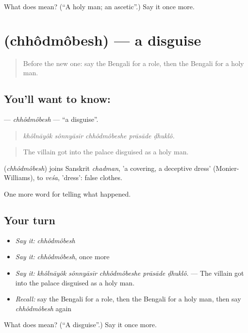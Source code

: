 \begin{tcolorbox}[breakable,colback=teal!4,colframe=teal!35!black,title={Before you move on}]
What does  mean? (\textquotedblleft{}A holy man; an ascetic\textquotedblright{}.) Say it once more.
\end{tcolorbox}
\section[\texorpdfstring{\bn{ছদ্মবেশ} (chhôdmôbesh)}{ছদ্মবেশ (chhôdmôbesh)}]{ (chhôdmôbesh) — a disguise}

\label{lesson:BN-C323-chhodmobesh}



\begin{quote}
Before the new one: say the Bengali for a role, then the Bengali for a holy man.
\end{quote}

\subsection*{You'll want to know: }
\textbf{} — \emph{chhôdmôbesh} — \textquotedblleft{}a disguise\textquotedblright{}.

\begin{quote}
    
\end{quote}

\begin{quote}
\emph{khôlnāyôk sônnyāsīr chhôdmôbeshe prāsāde ḍhuklô.}
\end{quote}

\begin{quote}
The villain got into the palace disguised as a holy man.
\end{quote}

\begin{cousinweb}
\textbf{} (\emph{chhôdmôbesh}) joins Sanskrit \emph{chadman}, 'a covering, a deceptive dress' (Monier-Williams), to \emph{veśa}, 'dress': false clothes.
\end{cousinweb}

\begin{grammarlens}[title={What you've built}]
One more word for telling what happened.
\end{grammarlens}

\subsection*{Your turn}
\begin{itemize}
\raggedright
  \item \emph{Say it:} \emph{chhôdmôbesh}
  \item \emph{Say it:} \emph{chhôdmôbesh}, once more
  \item \emph{Say it:} \emph{khôlnāyôk sônnyāsīr chhôdmôbeshe prāsāde ḍhuklô.} — The villain got into the palace disguised as a holy man.
  \item \emph{Recall:} say the Bengali for a role, then the Bengali for a holy man, then say \emph{chhôdmôbesh} again
\end{itemize}

\begin{tcolorbox}[breakable,colback=teal!4,colframe=teal!35!black,title={Before you move on}]
What does  mean? (\textquotedblleft{}A disguise\textquotedblright{}.) Say it once more.
\end{tcolorbox}
